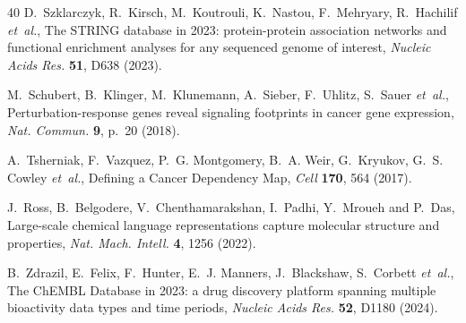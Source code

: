 \documentclass{ws-procs11x85}
\begin{document}
\begin{thebibliography}{40}
D.~Szklarczyk, R.~Kirsch, M.~Koutrouli, K.~Nastou, F.~Mehryary, R.~Hachilif {\it
  et~al.}, The STRING database in 2023: protein-protein association networks and
  functional enrichment analyses for any sequenced genome of interest, {\it
  Nucleic Acids Res.} {\bf 51}, D638 (2023).

M.~Schubert, B.~Klinger, M.~Klunemann, A.~Sieber, F.~Uhlitz, S.~Sauer {\it
  et~al.}, Perturbation-response genes reveal signaling footprints in cancer
  gene expression, {\it Nat. Commun.} {\bf 9}, p.~20 (2018).

A.~Tsherniak, F.~Vazquez, P.~G. Montgomery, B.~A. Weir, G.~Kryukov, G.~S. Cowley
  {\it et~al.}, Defining a Cancer Dependency Map, {\it Cell} {\bf 170}, 564
  (2017).

J.~Ross, B.~Belgodere, V.~Chenthamarakshan, I.~Padhi, Y.~Mroueh and P.~Das,
  Large-scale chemical language representations capture molecular structure and
  properties, {\it Nat. Mach. Intell.} {\bf 4}, 1256 (2022).

B.~Zdrazil, E.~Felix, F.~Hunter, E.~J. Manners, J.~Blackshaw, S.~Corbett {\it
  et~al.}, The ChEMBL Database in 2023: a drug discovery platform spanning
  multiple bioactivity data types and time periods, {\it Nucleic Acids Res.}
  {\bf 52}, D1180 (2024).

\end{thebibliography}
\end{document}
